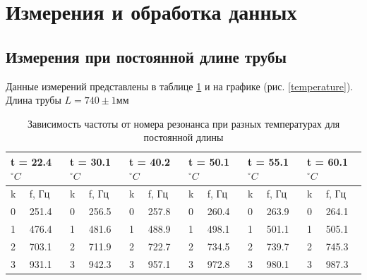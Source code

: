 \documentclass[a4paper,12pt]{article} %
\begin{document}
\section{Измерения и обработка данных}

\subsection{Измерения при постоянной длине трубы}
Данные измерений представлены в таблице \ref{tbl:температура} и на графике (рис. \ref{temperature}). Длина трубы $L = 740 \pm 1 мм$

\begin{table}[h!]
\caption{Зависимость частоты от номера резонанса при разных температурах для постоянной длины}
\label{tbl:температура}
\begin{tabular}{|ll|ll|ll|ll|ll|ll|}
\hline
\multicolumn{2}{|l|}{t = 22.4 $^\circ C$} & \multicolumn{2}{l|}{t = 30.1 $^\circ C$} & \multicolumn{2}{l|}{t = 40.2 $^\circ C$} & \multicolumn{2}{l|}{t = 50.1 $^\circ C$} & \multicolumn{2}{l|}{t = 55.1 $^\circ C$} & \multicolumn{2}{l|}{t = 60.1 $^\circ C$} \\ \hline
\multicolumn{1}{|l|}{k}      & f, Гц      & \multicolumn{1}{l|}{k}      & f, Гц      & \multicolumn{1}{l|}{k}     & f, Гц      & \multicolumn{1}{l|}{k}      & f, Гц      & \multicolumn{1}{l|}{k}      & f, Гц      & \multicolumn{1}{l|}{k}      & f, Гц      \\ \hline
\multicolumn{1}{|l|}{0}      & 251.4      & \multicolumn{1}{l|}{0}      & 256.5      & \multicolumn{1}{l|}{0}     & 257.8      & \multicolumn{1}{l|}{0}      & 260.4      & \multicolumn{1}{l|}{0}      & 263.9      & \multicolumn{1}{l|}{0}      & 264.1      \\ \hline
\multicolumn{1}{|l|}{1}      & 476.4      & \multicolumn{1}{l|}{1}      & 481.6      & \multicolumn{1}{l|}{1}     & 488.9      & \multicolumn{1}{l|}{1}      & 498.1      & \multicolumn{1}{l|}{1}      & 501.1      & \multicolumn{1}{l|}{1}      & 505.1      \\ \hline
\multicolumn{1}{|l|}{2}      & 703.1      & \multicolumn{1}{l|}{2}      & 711.9      & \multicolumn{1}{l|}{2}     & 722.7      & \multicolumn{1}{l|}{2}      & 734.5      & \multicolumn{1}{l|}{2}      & 739.7      & \multicolumn{1}{l|}{2}      & 745.3      \\ \hline
\multicolumn{1}{|l|}{3}      & 931.1      & \multicolumn{1}{l|}{3}      & 942.3      & \multicolumn{1}{l|}{3}     & 957.1      & \multicolumn{1}{l|}{3}      & 972.8      & \multicolumn{1}{l|}{3}      & 980.1      & \multicolumn{1}{l|}{3}      & 987.3      \\ \hline

\end{tabular}
\end{table}
\end{document}
